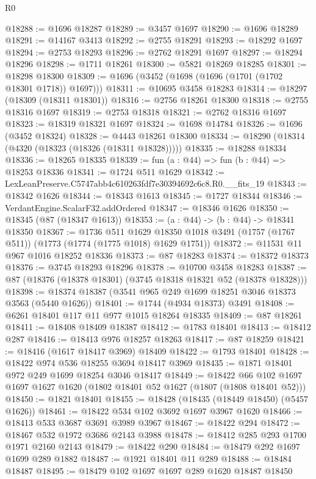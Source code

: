 \begin{lexlean}{R0}
\begin{coremodule}
@18288 := @1696 @18287
@18289 := @3457 @1697
@18290 := @1696 @18289
@18291 := @14167 @3413
@18292 := @2755 @18291
@18293 := @18292 @1697
@18294 := @2753 @18293
@18296 := @2762 @18291 @1697
@18297 := @18294 @18296
@18298 := @1711 @18261
@18300 := @5821 @18269 @18285
@18301 := @18298 @18300
@18309 := @1696 (@3452 (@1698 (@1696 (@1701 (@1702 @18301 @1718)) @1697)))
@18311 := @10695 @3458 @18283
@18314 := @18297 (@18309 (@18311 @18301))
@18316 := @2756 @18261 @18300
@18318 := @2755 @18316 @1697
@18319 := @2753 @18318
@18321 := @2762 @18316 @1697
@18323 := @18319 @18321 @1697
@18324 := @1698 @14784
@18326 := @1696 (@3452 @18324)
@18328 := @4443 @18261 @18300
@18334 := @18290 (@18314 (@4320 (@18323 (@18326 (@18311 @18328)))))
@18335 := @18288 @18334
@18336 := @18265 @18335
@18339 := fun (a : @44) => fun (b : @44) => @18253 @18336
@18341 := @1724 @511 @1629
@18342 := LexLeanPreserve.C5747abb4c610263fdf7e30394692c6c8.R0.__fits_19
@18343 := @18342 @1626
@18344 := @18343 @1613
@18345 := @1727 @18344
@18346 := VerdantEngine.ScalarF32.addOrdered
@18347 := @18346 @1626
@18350 := @18345 (@87 (@18347 @1613))
@18353 := (a : @44) -> (b : @44) -> @18341 @18350
@18367 := @1736
    @511
    @1629
    @18350
    @1018
    @3491
    (@1757 (@1767 @511))
    (@1773 (@1774 (@1775 @1018) @1629 @1751))
@18372 := @11531 @11 @967 @1016 @18252 @18336
@18373 := @87 @18283
@18374 := @18372 @18373
@18376 := @3745 @18293 @18296
@18378 := @10700 @3458 @18283
@18387 := @87 (@18376 (@18378 @18301) (@3745 @18318 @18321 @52 (@18378 @18328)))
@18398 := @18374 @18387 (@3541 @965 @249 @1699 @18251 @3046 @18373 @3563 (@5440 @1626))
@18401 := @1744 (@4934 @18373) @3491
@18408 := @6261 @18401 @117 @11 @977 @1015 @18264 @18335
@18409 := @87 @18261
@18411 := @18408 @18409 @18387
@18412 := @1783 @18401
@18413 := @18412 @287
@18416 := @18413 @976 @18257 @18263
@18417 := @87 @18259
@18421 := @18416 (@1617 @18417 @3969) @18409
@18422 := @1793 @18401
@18428 := @18422 @974 @536 @18255 @3694 @18417 @3969
@18435 := @1871 @18401 @972 @249 @1699 @18254 @3046 @18417
@18449 := @18422
    @66
    @102
    @1697
    @1697
    @1627
    @1620
    (@1802 @18401 @52 @1627 (@1807 (@1808 @18401 @52)))
@18450 := @1821 @18401
@18455 := @18428 (@18435 (@18449 @18450) (@5457 @1626))
@18461 := @18422 @534 @102 @3692 @1697 @3967 @1620
@18466 := @18413 @533 @3687 @3691 @3989 @3967
@18467 := @18422 @294
@18472 := @18467 @532 @1972 @3686 @2143 @3988
@18478 := @18412 @285 @293 @1700 @1971 @2160 @2143
@18479 := @18422 @290
@18484 := @18479 @292 @1697 @1699 @289 @1882
@18487 := @1921 @18401 @11 @289
@18488 := @18484 @18487
@18495 := @18479 @102 @1697 @1697 @289 @1620 @18487 @18450

\end{coremodule}
\end{lexlean}
